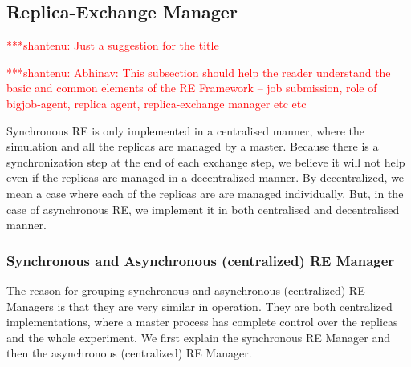 \documentclass{rspublic}
\newcommand{\jhanote}[1]{ {\textcolor{red} { ***shantenu: #1 }}}
\newcommand{\alnote}[1]{ {\textcolor{blue} { ***andre: #1 }}}
\newcommand{\athotanote}[1]{ {\textcolor{green} { ***athota: #1 }}}
\newcommand{\alnote}[1]{}
\newcommand{\athotanote}[1]{}
\newcommand{\jhanote}[1]{}
\begin{document}
\subsection{Replica-Exchange Manager}\label{repexmanager} 

\jhanote{Just a suggestion for the title}

\jhanote{Abhinav: This subsection should help the reader understand
  the basic and common elements of the RE Framework -- job submission,
  role of bigjob-agent, replica agent, replica-exchange manager etc
  etc}
  
  Synchronous RE is only implemented in a centralised manner, where the
simulation and all the replicas are managed by a master.  %
Because there is a synchronization step at the end of each exchange
step, we believe it will not help even if the replicas are managed in
a decentralized manner. By decentralized, we mean a case where each of the replicas are are managed individually. But, in the case of asynchronous RE, we
implement it in both centralised and decentralised manner. %


\subsubsection{Synchronous and Asynchronous (centralized) RE Manager}
The reason for grouping synchronous and asynchronous (centralized) RE Managers is that they are very similar in operation. They are both centralized implementations, where a master process has complete control over the replicas and the whole experiment. We first explain the synchronous RE Manager and then the asynchronous (centralized) RE Manager.
\end{document}

